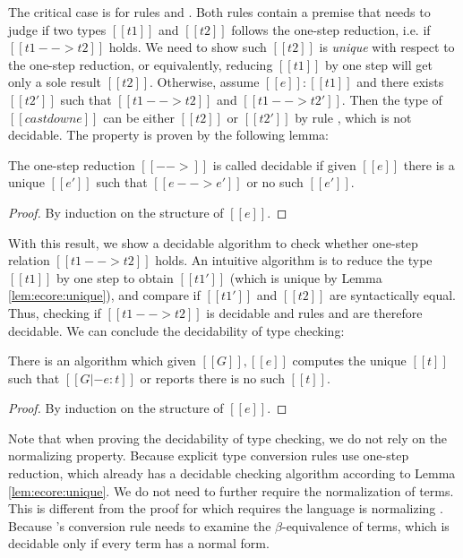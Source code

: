 The critical case is for rules  and .
Both rules contain a premise that needs to judge if two types $[[t1]]$ and
$[[t2]]$ follows the one-step reduction, i.e. if $[[t1 --> t2]]$ holds. We need
to show such $[[t2]]$ is \emph{unique} with respect to the one-step reduction,
or equivalently, reducing $[[t1]]$ by one step will get only a sole result
$[[t2]]$. Otherwise, assume $[[e]]:[[t1]]$ and there exists $[[t2']]$ such that
$[[t1 --> t2]]$ and $[[t1 --> t2']]$. Then the type of $[[castdown e]]$ can be
either $[[t2]]$ or $[[t2']]$ by rule , which is not
decidable. The property is proven by the following lemma:

\begin{lem}\label{lem:ecore:unique}
	The one-step reduction $[[-->]]$ is called decidable if 
given $[[e]]$ there is a unique $[[e']]$ such that $[[e --> e']]$ or no such $[[e']]$.
\end{lem}

\begin{proof}
	By induction on the structure of $[[e]]$.
\end{proof}

With this result, we show a decidable algorithm to check whether one-step
relation $[[t1 --> t2]]$ holds. An intuitive algorithm is to reduce the type
$[[t1]]$ by one step to obtain $[[t1']]$ (which is unique by Lemma
\ref{lem:ecore:unique}), and compare if $[[t1']]$ and $[[t2]]$ are
syntactically equal. Thus, checking if $[[t1 --> t2]]$ is decidable and rules
 and  are therefore decidable. We can
conclude the decidability of type checking:

\begin{thm}\label{lem:ecore:decide}
	There is an algorithm which given $[[G]], [[e]]$ computes the unique
$[[t]]$ such that $[[G |- e:t]]$ or reports there is no such $[[t]]$.
\end{thm}

\begin{proof}
	By induction on the structure of $[[e]]$.
\end{proof}

Note that when proving the decidability of type checking, we do not rely on the
normalizing property. Because explicit type conversion rules use one-step
reduction, which already has a decidable checking algorithm according to Lemma
\ref{lem:ecore:unique}. We do not need to further require the normalization of
terms. This is different from the proof for \cc which requires the language is
normalizing \cite{pts:normalize}. Because \cc's conversion rule needs to
examine the $\beta$-equivalence of terms, which is decidable only if every term
has a normal form.

